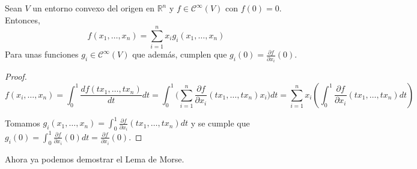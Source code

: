 \begin{lemma}
    Sean $V$ un entorno convexo del origen en $\mathbb{R}^n$ y $f\in \mathcal{C}^\infty(V)$ con $f(0)=0$. Entonces,
    \begin{equation*}
        f(x_1,\dots,x_n)=\sum_{i=1}^n x_ig_i(x_1,\dots,x_n)
    \end{equation*}
    Para unas funciones $g_i\in \mathcal{C}^\infty(V)$ que además, cumplen que $g_i(0)=\frac{\partial f}{\partial x_i}(0)$.
\end{lemma}
\begin{proof}
\begin{equation*}
    f(x_i,\dots,x_n)=\int_0^1 \frac{df(tx_1,\dots,tx_n)}{dt}dt = \int_0^1 \big(\sum_{i=1}^n \frac{\partial f}{\partial x_i}(tx_1,\dots,tx_n)x_i \big)dt =\sum_{i=1}^n x_i \left(\int_0^1 \frac{\partial f}{\partial x_i}(tx_1,\dots,tx_n )dt\right)
\end{equation*}

Tomamos $g_i(x_1,\dots,x_n) = \int_0^1 \frac{\partial f}{\partial x_i}(tx_1,\dots,tx_n )dt$ y se cumple que $g_i(0)=\int_0^1 \frac{\partial f}{\partial x_i}(0)dt =\frac{\partial f}{\partial x_i}(0)$.

\end{proof}
\bigskip
Ahora ya podemos demostrar el Lema de Morse.
\bigskip
